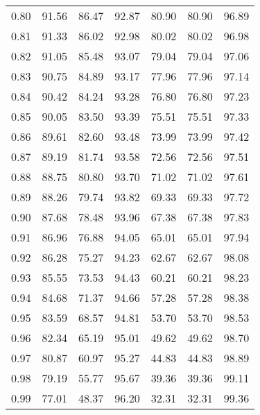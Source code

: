 \begin{tabular}{|c|c|c|c|c|c|c|}
      0.80 &     91.56 &     86.47 &      92.87 &   80.90 &      80.90 &         96.89 \\
      0.81 &     91.33 &     86.02 &      92.98 &   80.02 &      80.02 &         96.98 \\
      0.82 &     91.05 &     85.48 &      93.07 &   79.04 &      79.04 &         97.06 \\
      0.83 &     90.75 &     84.89 &      93.17 &   77.96 &      77.96 &         97.14 \\
      0.84 &     90.42 &     84.24 &      93.28 &   76.80 &      76.80 &         97.23 \\
      0.85 &     90.05 &     83.50 &      93.39 &   75.51 &      75.51 &         97.33 \\
      0.86 &     89.61 &     82.60 &      93.48 &   73.99 &      73.99 &         97.42 \\
      0.87 &     89.19 &     81.74 &      93.58 &   72.56 &      72.56 &         97.51 \\
      0.88 &     88.75 &     80.80 &      93.70 &   71.02 &      71.02 &         97.61 \\
      0.89 &     88.26 &     79.74 &      93.82 &   69.33 &      69.33 &         97.72 \\
      0.90 &     87.68 &     78.48 &      93.96 &   67.38 &      67.38 &         97.83 \\
      0.91 &     86.96 &     76.88 &      94.05 &   65.01 &      65.01 &         97.94 \\
      0.92 &     86.28 &     75.27 &      94.23 &   62.67 &      62.67 &         98.08 \\
      0.93 &     85.55 &     73.53 &      94.43 &   60.21 &      60.21 &         98.23 \\
      0.94 &     84.68 &     71.37 &      94.66 &   57.28 &      57.28 &         98.38 \\
      0.95 &     83.59 &     68.57 &      94.81 &   53.70 &      53.70 &         98.53 \\
      0.96 &     82.34 &     65.19 &      95.01 &   49.62 &      49.62 &         98.70 \\
      0.97 &     80.87 &     60.97 &      95.27 &   44.83 &      44.83 &         98.89 \\
      0.98 &     79.19 &     55.77 &      95.67 &   39.36 &      39.36 &         99.11 \\
      0.99 &     77.01 &     48.37 &      96.20 &   32.31 &      32.31 &         99.36 \\
\bottomrule
\end{tabular}

